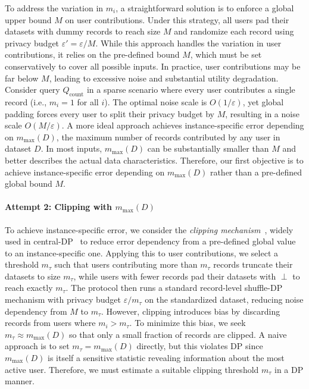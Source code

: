 To address the variation in $m_i$, a straightforward solution is to enforce a global upper bound $M$ on user contributions. 
Under this strategy, all users pad their datasets with dummy records to reach size $M$ and randomize each record using privacy budget $\varepsilon' = \varepsilon / M$. 
While this approach handles the variation in user contributions, it relies on the pre-defined bound $M$, which must be set conservatively to cover all possible inputs. 
In practice, user contributions may be far below $M$, leading to excessive noise and substantial utility degradation. 
Consider query $Q_\text{count}$ in a sparse scenario where every user contributes a single record (i.e., $m_i = 1$ for all $i$). 
The optimal noise scale is $O(1/\varepsilon)$, yet global padding forces every user to split their privacy budget by $M$, resulting in a noise scale $O(M/\varepsilon)$. 
A more ideal approach achieves instance-specific error depending on $m_{\max}(D)$, the maximum number of records contributed by any user in dataset $D$. 
In most inputs, $m_{\max}(D)$ can be substantially smaller than $M$ and better describes the actual data characteristics. 
Therefore, our first objective is to achieve instance-specific error depending on $m_{\max}(D)$ rather than a pre-defined global bound $M$.





\paragraph{Attempt 2: Clipping with $m_{\max}(D)$}



To achieve instance-specific error, we consider the \textit{clipping mechanism}~\cite{abadi2016deep,huang2021instance}, widely used in central-DP~\cite{dong2024almost} to reduce error dependency from a pre-defined global value to an instance-specific one. 
Applying this to user contributions, we select a threshold $m_\tau$ such that users contributing more than $m_\tau$ records truncate their datasets to size $m_\tau$, while users with fewer records pad their datasets with $\perp$ to reach exactly $m_\tau$. 
The protocol then runs a standard record-level shuffle-DP mechanism with privacy budget $\varepsilon/m_\tau$ on the standardized dataset, reducing noise dependency from $M$ to $m_\tau$. 
However, clipping introduces bias by discarding records from users where $m_i > m_\tau$. 
To minimize this bias, we seek $m_\tau \approx m_{\max}(D)$ so that only a small fraction of records are clipped. 
A naive approach is to set $m_\tau = m_{\max}(D)$ directly, but this violates DP since $m_{\max}(D)$ is itself a sensitive statistic revealing information about the most active user. 
Therefore, we must estimate a suitable clipping threshold $m_\tau$ in a DP manner.





